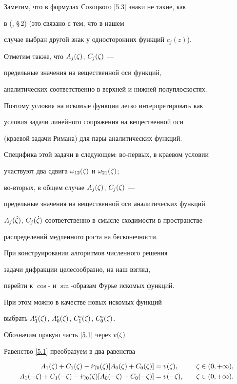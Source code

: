 Заметим, что в формулах Сохоцкого \eqref{5.3} знаки не такие, как


в (\cite{GahChe}, \S\,2) (это связано с тем, что в нашем


случае выбран другой знак у односторонних функций $c_j(z)$).





Отметим также, что $A_j(\zeta)$,  $C_j(\zeta)$ ---


предельные значения на вещественной оси функций,


аналитических соответственно в верхней и нижней полуплоскостях.


Поэтому условия на искомые функции легко интерпретировать как


условия задачи линейного сопряжения на вещественной оси


(краевой задачи Римана) для пары аналитических функций.


Специфика этой задачи в следующем: во-первых, в краевом условии


участвуют два сдвига $\omega_{12}(\zeta)$ и $\omega_{21}(\zeta)$;


во-вторых, в общем случае $A_j(\zeta)$,  $C_j(\zeta)$ ---


предельные значения на вещественной оси аналитических функций


$A_j(\Dot{\zeta})$,  $C_j(\Dot{\zeta})$ соответственно в смысле сходимости в пространстве


распределений медленного роста на бесконечности.





При конструировании алгоритмов численного решения


задачи дифракции целесообразно, на наш взгляд,


перейти к $\cos$-  и $\sin$-образам Фурье искомых функций.


При этом можно в качестве новых искомых функций


выбрать $A^c_1(\zeta)$, $ A^c_0(\zeta)$, $ C^s_1(\zeta)$, $ C^s_0(\zeta)$.





Обозначим правую часть \eqref{5.1} через $v(\zeta)$.


Равенство \eqref{5.1} преобразуем в два равенства


\begin{alignat*}{2}


A_1(\dz)+C_1(\dz)-i \gazdz [A_0(\dz)+C_0(\dz)]&=v(\dz),


&\quad \dz&\in(0,+\infty), \\


%


A_1(-\dz)+C_1(-\dz)-i \gazdz [A_0(-\dz)+C_0(-\dz)]&=v(-\dz),


&\quad \dz&\in(0,+\infty).


\end{alignat*}


